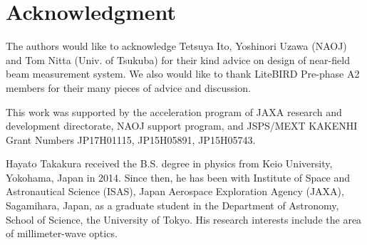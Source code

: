 \documentclass[journal]{IEEEtran}
\begin{document}
\section*{Acknowledgment}
%
The authors would like to acknowledge Tetsuya Ito, Yoshinori Uzawa (NAOJ) and Tom Nitta (Univ. of Tsukuba) for 
their kind advice on design of near-field beam measurement system. We also would like to thank LiteBIRD Pre-phase A2 members for their many pieces of advice and discussion.
\par
This work was supported by 
the acceleration program of JAXA research and development directorate,
NAOJ support program, and
JSPS/MEXT KAKENHI Grant Numbers JP17H01115, JP15H05891, JP15H05743.
%
\ifCLASSOPTIONcaptionsoff
  \newpage
\fi
%
%
%

%

%
%
% 
%
\begin{IEEEbiography}{Hayato Takakura}
received the B.S. degree in physics from Keio University, Yokohama, Japan in 2014. Since then, he has been with Institute of Space and Astronautical Science (ISAS), Japan Aerospace Exploration Agency (JAXA), Sagamihara, Japan, as a graduate student in the Department of Astronomy, School of Science, the University of Tokyo. His research interests include the area of millimeter-wave optics.
\end{IEEEbiography}
\end{document}
